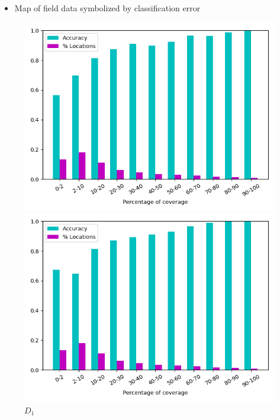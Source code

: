 \def\year{2017}\relax \documentclass[letterpaper]{article}
\begin{document}
\begin{itemize}
\item{Map of field data symbolized by classification error}
\end{itemize}
\begin{figure}
\centering
\begin{minipage}{.24\textwidth}
  \centering
\includegraphics[width=\textwidth]{pics/d1_accuracy_vs_coverage.png}
\caption{$D_1$}
\end{minipage}
\begin{minipage}{.01\textwidth}
\end{minipage}
\begin{minipage}{.24\textwidth}
  \centering
\includegraphics[width=\textwidth]{pics/d2_accuracy_vs_coverage.png}

\end{minipage}
\end{figure}
\end{document}

